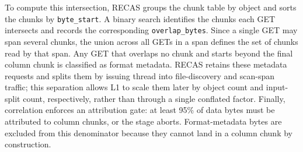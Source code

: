 To compute this intersection, RECAS groups the chunk table by
object and sorts the chunks by \texttt{byte\_start}. 
A binary search identifies the chunks each GET intersects and records the corresponding \texttt{overlap\_bytes}. Since a single GET may span several chunks, the union across all GETs in a span defines the set of chunks read by that span. Any GET that overlaps no chunk and starts beyond the final column chunk is classified as format metadata. RECAS retains these metadata requests and splits them by issuing thread into file-discovery and scan-span traffic; this separation allows L1 to scale them later by object count and input-split count, respectively, rather than through a single conflated factor. Finally, correlation enforces an attribution gate: at least 95\% of data bytes must be attributed to column chunks, or the stage aborts. Format-metadata bytes are excluded from this denominator because they cannot land in a column chunk by construction.

